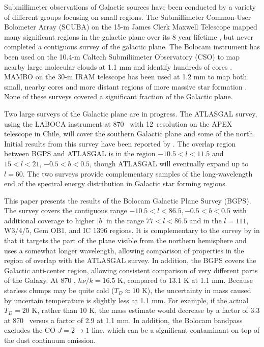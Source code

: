 \documentclass{emulateapj}
\newcommand{\td}{\mbox{$T_D$}}
\newcommand{\jj}[2]{\mbox{$J = #1\rightarrow#2$}}
\newcommand{\lon}{\ensuremath{l}}
\begin{document}
Submillimeter observations of Galactic sources have been conducted by
a variety of different groups focusing on small regions.  The
Submillimeter Common-User Bolometer Array (SCUBA) on the 15-m James
Clerk Maxwell Telescope mapped many significant regions in the
galactic plane over its 8 year lifetime
\citep{holland99,difrancesco08}, but never completed a contiguous
survey of the galactic plane.  The Bolocam instrument has been used on
the 10.4-m Caltech Submiliimeter Observatory (CSO) to map nearby large
molecular clouds at 1.1 mm and identify hundreds of cores
\citep{enoch06}.  MAMBO on the 30-m IRAM telescope has been used at
1.2 mm to map both small, nearby cores \citep{kauffmann08} and more
distant regions of more massive star formation \citep{motte07}.  None
of these surveys covered a significant fraction of the Galactic plane.

Two large surveys of the Galactic plane are in progress.  The ATLASGAL
survey, using the LABOCA instrument at 870 \micron\ with 12\arcsec\
resolution on the APEX telescope in Chile, will cover the southern
Galactic plane and some of the north.  Initial results from this
survey have been reported by \citet{schuller09}. The overlap region
between BGPS and ATLASGAL is in the region $-10.5 < \lon < 11.5$ and
$15 < \lon < 21$, $-0.5 < b < 0.5$, though ATLASGAL will eventually
expand up to $\lon = 60$.  The two surveys provide complementary
samples of the long-wavelength end of the spectral energy distribution
in Galactic star forming regions.



This paper presents the results of the Bolocam Galactic Plane Survey
(BGPS).  The survey covers the contiguous range $-10.5 < \lon < 86.5,
-0.5 < b < 0.5$ with additional coverage to higher $|b|$ in the range
$77 < \lon < 86.5$ and in the $\lon=111$, W3/4/5, Gem OB1, and IC 1396
regions.  It is complementary to the survey by \citet{schuller09} in
that it targets the part of the plane visible from the northern
hemisphere and uses a somewhat longer wavelength, allowing comparison
of properties in the region of overlap with the ATLASGAL survey.  In
addition, the BGPS covers the Galactic anti-center region, allowing
consistent comparison of very different parts of the Galaxy.  At 870
\micron, $h\nu/k = 16.5$ K, compared to 13.1 K at 1.1 mm.  Because
starless clumps may be quite cold ($\td \approx 10$ K), the
uncertainty in mass caused by uncertain temperature is slightly less
at 1.1 mm.  For example, if the actual $\td = 20$ K, rather than 10 K,
the mass estimate would decrease by a factor of 3.3 at 870 \micron\
versus a factor of 2.9 at 1.1 mm.  In addition, the Bolocam bandpass
excludes the CO \jj{2}{1} line, which can be a significant contaminant
on top of the dust continuum emission.
\end{document}
